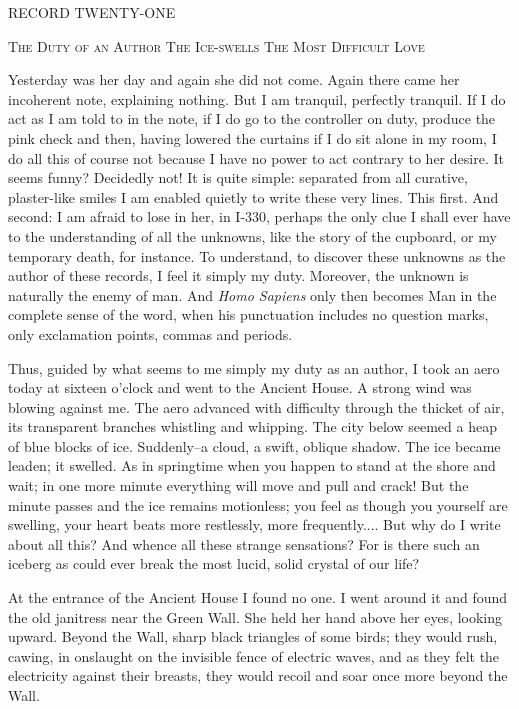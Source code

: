 \documentclass[11pt,openany]{book}
\begin{document}
\begin{center}\textsc{RECORD TWENTY-ONE}\end{center}

\begin{center}\textsc{The Duty of an Author The Ice-swells The Most Difficult Love}\end{center}

Yesterday was her day and again she did not come. Again there came her incoherent note, explaining nothing. But I am tranquil, perfectly tranquil. If I do act as I am told to in the note, if I do go to the controller on duty, produce the pink check and then, having lowered the curtains if I do sit alone in my room, I do all this of course not because I have no power to act contrary to her desire. It seems funny? Decidedly not! It is quite simple: separated from all curative, plaster-like smiles I am enabled quietly to write these very lines. This first. And second: I am afraid to lose in her, in I-330, perhaps the only clue I shall ever have to the understanding of all the unknowns, like the story of the cupboard, or my temporary death, for instance. To understand, to discover these unknowns as the author of these records, I feel it simply my duty. Moreover, the unknown is naturally the enemy of man. And \emph{Homo Sapiens} only then becomes Man in the complete sense of the word, when his punctuation includes no question marks, only exclamation points, commas and periods.

Thus, guided by what seems to me simply my duty as an author, I took an aero today at sixteen o'clock and went to the Ancient House. A strong wind was blowing against me. The aero advanced with difficulty through the thicket of air, its transparent branches whistling and whipping. The city below seemed a heap of blue blocks of ice. Suddenly--a cloud, a swift, oblique shadow. The ice became leaden; it swelled. As in springtime when you happen to stand at the shore and wait; in one more minute everything will move and pull and crack! But the minute passes and the ice remains motionless; you feel as though you yourself are swelling, your heart beats more restlessly, more frequently.... But why do I write about all this? And whence all these strange sensations? For is there such an iceberg as could ever break the most lucid, solid crystal of our life?

At the entrance of the Ancient House I found no one. I went around it and found the old janitress near the Green Wall. She held her hand above her eyes, looking upward. Beyond the Wall, sharp black triangles of some birds; they would rush, cawing, in onslaught on the invisible fence of electric waves, and as they felt the electricity against their breasts, they would recoil and soar once more beyond the Wall.
\end{document}
